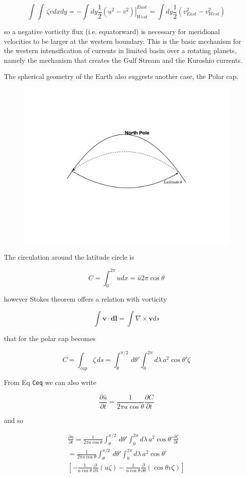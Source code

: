 \[\int\int \, \zeta v dx dy = -\int dy \frac{1}{2}\left.(u^2-v^2)\right|^{East}_{West}=\int dy \frac{1}{2}\left( v^2_{East}-v^2_{West}\right)\]

so a negative vorticity flux (i.e. equatorward) is necessary for
meridional velocities to be larger at the western boundary. This is the
basic mechanism for the western intensification of currents in limited
basin over a rotating planets, namely the mechanism that creates the
Gulf Stream and the Kuroshio currents.

The spherical geometry of the Earth also suggests another case, the
Polar cap.


\begin{figure}
\centering
\includegraphics[width= .7 \textwidth]{figs/GD/polarcap.png}
\caption{}
\label{fig:}
\end{figure}

The circulation around the latitude circle is

{\[C=\int_0^{2\pi} u dx = \bar{u}2\pi \cos\theta\]}

however Stokes theorem offers a relation with vorticity

\[\int \mathbf{v}\cdot \mathbf{dl} = \int\nabla \times \mathbf{v}ds\]

that for the polar cap becomes

\[C=\int_{cap} \zeta \,ds = \int_\theta^{\pi/2}\, d\theta' \int_0^{2\pi} d\lambda\, a^2 \cos\theta' \zeta\]

From Eq \texttt{Ceq} we can also write

\[\frac{\partial \bar{u}}{\partial t} = \frac{1}{2\pi a\cos\theta}\frac{\partial C}{\partial t}\]

and so

\[\begin{aligned}
\frac{\partial \bar{u}}{\partial t} =\frac{1}{2\pi a\cos\theta}\int_\theta^{\pi/2}\, d\theta' \int_0^{2\pi}d\lambda\, a^2 \cos\theta' \frac{\partial \zeta}{\partial t} \\
=\frac{1}{2\pi a\cos\theta}\int_\theta^{\pi/2}\, d\theta' \int_0^{2\pi}d\lambda\, a^2 \cos\theta' \\
\left[ -\frac{1}{a \cos\theta}\frac{\partial }{\partial \lambda} (u\zeta) -\frac{1}{a \cos\theta}\frac{\partial }{\partial \theta}(\cos\theta v\zeta)\right]
\end{aligned}\]

